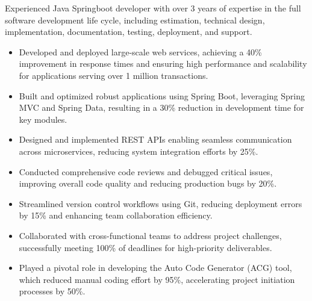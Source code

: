 \documentclass[10pt,a4paper]{altacv}
\begin{document}

%

\begin{fullwidth}
\makecvheader
\end{fullwidth}

%


Experienced Java Springboot developer with over 3 years of expertise in the full software development life cycle, including estimation, technical design, implementation, documentation, testing, deployment, and support.



\begin{itemize}
\item Developed and deployed large-scale web services, achieving a 40\% improvement in response times and ensuring high performance and scalability for applications serving over 1 million transactions.
    \item Built and optimized robust applications using Spring Boot, leveraging Spring MVC and Spring Data, resulting in a 30\% reduction in development time for key modules.
    \item Designed and implemented REST APIs enabling seamless communication across microservices, reducing system integration efforts by 25\%.
    \item Conducted comprehensive code reviews and debugged critical issues, improving overall code quality and reducing production bugs by 20\%.
    \item Streamlined version control workflows using Git, reducing deployment errors by 15\% and enhancing team collaboration efficiency.
    \item Collaborated with cross-functional teams to address project challenges, successfully meeting 100\% of deadlines for high-priority deliverables.
    \item Played a pivotal role in developing the Auto Code Generator (ACG) tool, which reduced manual coding effort by 95\%, accelerating project initiation processes by 50\%.


\end{itemize}
\end{document}
